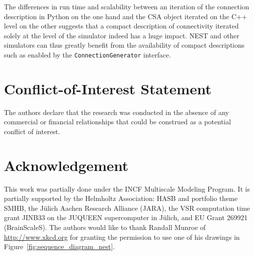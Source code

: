 \documentclass{frontiersSCNS} %
\begin{document}
The differences in run time and scalability between an iteration of
the connection description in Python on the one hand and the CSA
object iterated on the C++ level on the other suggests that a compact
description of connectivity iterated solely at the level of the
simulator indeed has a huge impact. NEST and other simulators can thus
greatly benefit from the availability of compact descriptions such as
enabled by the \verb|ConnectionGenerator| interface.


\section*{Conflict-of-Interest Statement}
The authors declare that the research was conducted in the absence of
any commercial or financial relationships that could be construed as a
potential conflict of interest.

\section*{Acknowledgement}
This work was partially done under the INCF Multiscale Modeling
Program. It is partially supported by the Helmholtz Association: HASB
and portfolio theme SMHB, the Jülich Aachen Research Alliance (JARA),
the VSR computation time grant JINB33 on the JUQUEEN supercomputer in
Jülich, and EU Grant 269921 (BrainScaleS). The authors would like to
thank Randall Munroe of \url{http://www.xkcd.org} for granting the
permission to use one of his drawings in
Figure~\ref{fig:sequence_diagram_nest}.



\end{document}
